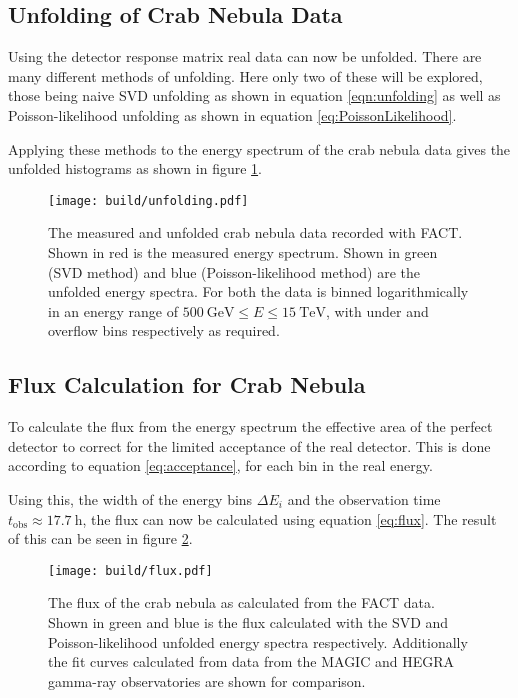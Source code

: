         \subsection{Unfolding of Crab Nebula Data}
            Using the detector response matrix real data can now be unfolded.
            There are many different methods of unfolding.
            Here only two of these will be explored, those being naive SVD unfolding as shown in equation \eqref{eqn:unfolding} as well as Poisson-likelihood unfolding as shown in equation \eqref{eq:PoissonLikelihood}.

            Applying these methods to the energy spectrum of the crab nebula data gives the unfolded histograms as shown in figure \ref{fig:unfolding}.
            \begin{figure}
                \centering
                \texttt{[image: build/unfolding.pdf]}
                \caption{
                    The measured and unfolded crab nebula data recorded with FACT.
                    Shown in red is the measured energy spectrum.
                    Shown in green (SVD method) and blue (Poisson-likelihood method) are the unfolded energy spectra.
                    For both the data is binned logarithmically in an energy range of $\SI{500}{\giga\electronvolt} \leq E \leq \SI{15}{\tera\electronvolt}$, with under and overflow bins respectively as required.
                }
                \label{fig:unfolding}
            \end{figure}

        \subsection{Flux Calculation for Crab Nebula}
            To calculate the flux from the energy spectrum the effective area of the perfect detector to correct for the limited acceptance of the real detector.
            This is done according to equation \eqref{eq:acceptance}, for each bin in the real energy.

            Using this, the width of the energy bins $\Delta E_i$ and the observation time $t_\text{obs} \approx \SI{17.7}{\hour}$, the flux can now be calculated using equation \eqref{eq:flux}.
            The result of this can be seen in figure \ref{fig:flux}.
            \begin{figure}
                \centering
                \texttt{[image: build/flux.pdf]}
                \caption{
                    The flux of the crab nebula as calculated from the FACT data.
                    Shown in green and blue is the flux calculated with the SVD and Poisson-likelihood unfolded energy spectra respectively.
                    Additionally the fit curves calculated from data from the MAGIC and HEGRA gamma-ray observatories are shown for comparison.
                }
                \label{fig:flux}
            \end{figure}


